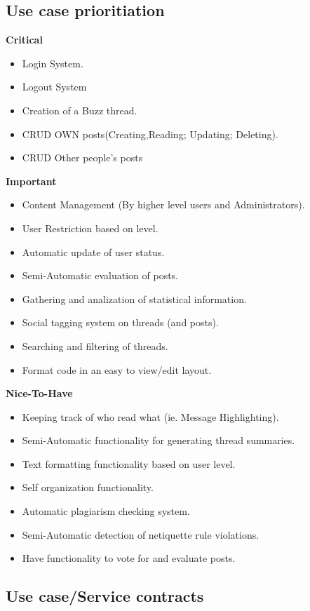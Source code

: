 \documentclass[a4paper,12pt]{report}
\begin{document}
\subsection{Use case prioritiation}
\textbf{Critical} 
\begin{itemize}
  \item Login System.
  \item Logout System
  \item Creation of a Buzz thread.
  \item CRUD OWN posts(Creating,Reading; Updating; Deleting).
  \item CRUD Other people's posts 
  \end{itemize}
\textbf{Important} 
\begin{itemize}
  \item Content Management (By higher level users and Administrators).
  \item User Restriction based on level.	
  \item Automatic update of user status.
  \item Semi-Automatic evaluation of posts.
  \item Gathering and analization of statistical information.
  \item Social tagging system on threads (and posts).
  \item Searching and filtering of threads.
  \item Format code in an easy to view/edit layout.
\end{itemize}
\textbf{Nice-To-Have} 
\begin{itemize}
  \item Keeping track of who read what (ie. Message Highlighting).
  \item Semi-Automatic functionality for generating thread summaries.
  \item Text formatting functionality based on user level.
  \item Self organization functionality.
  \item Automatic plagiarism checking system.
  \item Semi-Automatic detection of netiquette rule violations.
  \item Have functionality to vote for and evaluate posts.
\end{itemize}
\subsection{Use case/Service contracts}
\end{document}
